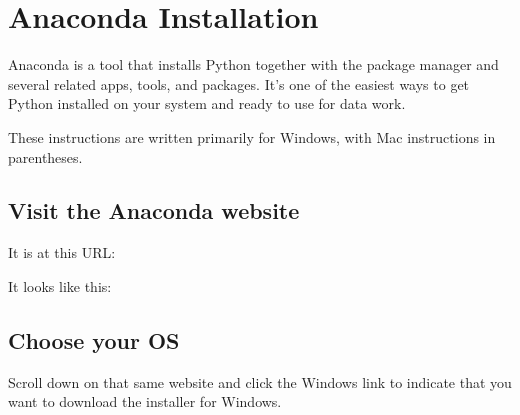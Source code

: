 \documentclass[letterpaper,10pt,english]{sphinxmanual}
\begin{document}
\begin{sphinxVerbatim}[commandchars=\\\{\}]
    
  
             
    
   
   
\end{sphinxVerbatim}


\chapter{Anaconda Installation}
\label{\detokenize{anaconda-installation:anaconda-installation}}\label{\detokenize{anaconda-installation::doc}}
Anaconda is a tool that installs Python together with the  package
manager and several related apps, tools, and packages.  It’s one of the
easiest ways to get Python installed on your system and ready to use for
data work.

These instructions are written primarily for Windows, with Mac
instructions in parentheses.


\section{Visit the Anaconda website}
\label{\detokenize{anaconda-installation:visit-the-anaconda-website}}
It is at this URL:

It looks like this:




\section{Choose your OS}
\label{\detokenize{anaconda-installation:choose-your-os}}
Scroll down on that same website and click the Windows link to indicate
that you want to download the installer for Windows.
\end{document}

